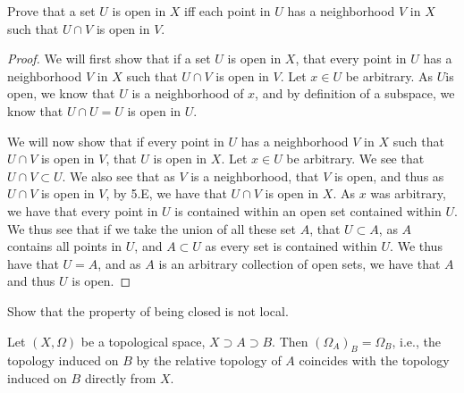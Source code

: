 \begin{minorEx}%
Prove that a set $U$ is open in $X$ iff each point in $U$ has a neighborhood $V$ in $X$ such that $U \cap V$ is open in $V$.
\end{minorEx}

\begin{proof}
  We will first show that if a set $U$ is open in $X$, that every
  point in $U$ has a neighborhood $V$ in $X$ such that $U \cap V$ is
  open in $V$. Let $x \in U$ be arbitrary. As $U$is open, we know that
  $U$ is a neighborhood of $x$, and by definition of a subspace, we
  know that $U\cap U=U$ is open in $U$.

  We will now show that if every point in $U$ has a neighborhood $V$
  in $X$ such that $U \cap V$ is open in $V$, that $U$ is open in
  $X$. Let $x \in U$ be arbitrary. We see that $U \cap V \subset
  U$. We also see that as $V$ is a neighborhood, that $V$ is open, and
  thus as $U \cap V $ is open in $V$, by 5.E, we have that $U \cap V$
  is open in $X$. As $x$ was arbitrary, we have that every point in
  $U$ is contained within an open set contained within $U$. We thus
  see that if we take the union of all these set $A$, that $U\subset
  A$, as $A$ contains all points in $U$, and $A \subset U$ as every
  set is contained within $U$. We thus have that $U=A$, and as $A$ is
  an arbitrary collection of open sets, we have that $A$ and thus $U$
  is open.
\end{proof}


\begin{minorEx}%
Show that the property of being closed is not local.
\end{minorEx}

\begin{majorEx}%
Let $(X, \Omega)$ be a topological space, $X \supset A \supset B$. Then $(\Omega_A)_B=\Omega_B$, i.e., the topology induced on $B$ by the relative topology of $A$ coincides with the topology induced on $B$ directly from $X$.
\end{majorEx}


